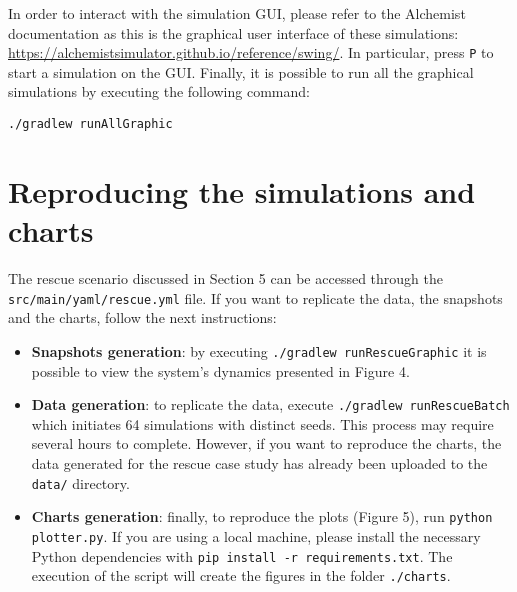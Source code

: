 \documentclass[runningheads]{llncs}
\def\doi#1{\href{https://doi.org/\detokenize{#1}}{\url{https://doi.org/\detokenize{#1}}}}
\begin{document}
In order to interact with the simulation GUI, 
please refer to the Alchemist documentation as this is the graphical user interface of these simulations: \url{https://alchemistsimulator.github.io/reference/swing/}.
%
In particular, press \texttt{P} to start a simulation on the GUI.
Finally, it is possible to run all the graphical simulations by executing the following command:
\begin{lstlisting}
./gradlew runAllGraphic
\end{lstlisting}
\section{Reproducing the simulations and charts}

The rescue scenario discussed in Section 5 can be accessed through the \texttt{src/main/yaml/rescue.yml} file. 
If you want to replicate the data, the snapshots and the charts, follow the next instructions:
\begin{itemize}
\item \textbf{Snapshots generation}: by executing \texttt{./gradlew runRescueGraphic} it is possible to view the system's dynamics presented in Figure 4. 

\item \textbf{Data generation}: to replicate the data, execute \texttt{./gradlew runRescueBatch} which initiates 64 simulations with distinct seeds. 
This process may require several hours to complete. 
However, if you want to reproduce the charts, the data generated for the rescue case study has already been uploaded to the \texttt{data/} directory. 

\item \textbf{Charts generation}: finally, to reproduce the plots (Figure 5), run \texttt{python plotter.py}. 
If you are using a local machine, please install the necessary Python dependencies with \texttt{pip install -r requirements.txt}.
The execution of the script will create the figures in the folder \texttt{./charts}.
\end{itemize}

%
%
%
%
\end{document}

